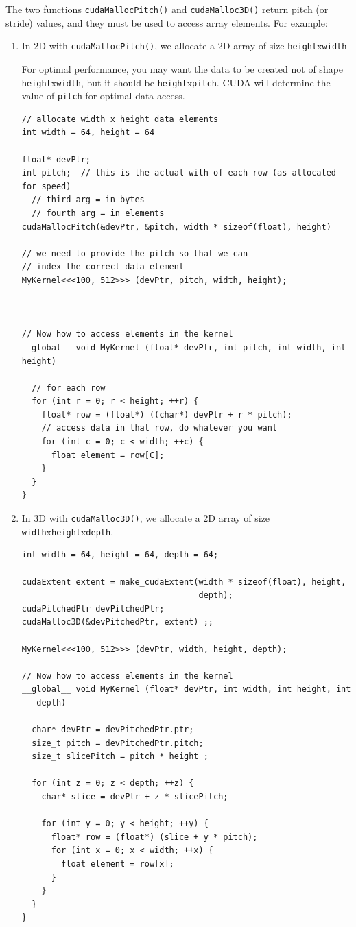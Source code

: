 The two functions \verb!cudaMallocPitch()! and \verb!cudaMalloc3D()!
return pitch (or stride) values, and they must be used to access array
elements. For example:
\begin{enumerate}
\item In 2D with \verb!cudaMallocPitch()!, we allocate a 2D array of
  size \verb!height!x\verb!width!

  For optimal performance, you may want the data to be created not of
  shape \verb!height!x\verb!width!, but it should be
  \verb!height!x\verb!pitch!. CUDA will determine the value of
  \verb!pitch! for optimal data access. 
\begin{lstlisting}
// allocate width x height data elements
int width = 64, height = 64

float* devPtr;
int pitch;  // this is the actual with of each row (as allocated for speed)
  // third arg = in bytes
  // fourth arg = in elements
cudaMallocPitch(&devPtr, &pitch, width * sizeof(float), height)

// we need to provide the pitch so that we can 
// index the correct data element
MyKernel<<<100, 512>>> (devPtr, pitch, width, height);



// Now how to access elements in the kernel
__global__ void MyKernel (float* devPtr, int pitch, int width, int
height)

  // for each row
  for (int r = 0; r < height; ++r) {
    float* row = (float*) ((char*) devPtr + r * pitch);
    // access data in that row, do whatever you want
    for (int c = 0; c < width; ++c) {
      float element = row[C];
    }
  }
}
\end{lstlisting}

\item In 3D with \verb!cudaMalloc3D()!, we allocate a 2D array of
  size \verb!width!x\verb!height!x\verb!depth!. 
\begin{lstlisting}
int width = 64, height = 64, depth = 64;

cudaExtent extent = make_cudaExtent(width * sizeof(float), height,
                                    depth);
cudaPitchedPtr devPitchedPtr;
cudaMalloc3D(&devPitchedPtr, extent) ;;

MyKernel<<<100, 512>>> (devPtr, width, height, depth);

// Now how to access elements in the kernel
__global__ void MyKernel (float* devPtr, int width, int height, int
   depth) 

  char* devPtr = devPitchedPtr.ptr;
  size_t pitch = devPitchedPtr.pitch;
  size_t slicePitch = pitch * height ; 

  for (int z = 0; z < depth; ++z) {
    char* slice = devPtr + z * slicePitch;

    for (int y = 0; y < height; ++y) {
      float* row = (float*) (slice + y * pitch);
      for (int x = 0; x < width; ++x) {
        float element = row[x];
      }
    }
  }
}
\end{lstlisting}

\end{enumerate}


